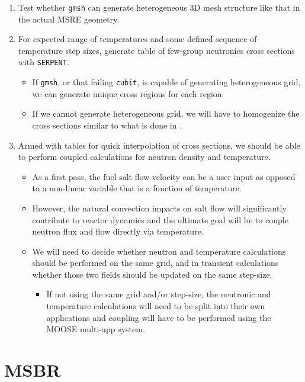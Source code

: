 \documentclass{article}
\let\Oldsection\section
\renewcommand{\section}{\FloatBarrier\Oldsection}
\newcommand{\code}[1]{\texttt{#1}}
\begin{document}
\begin{enumerate}
\item Test whether \code{gmsh} can generate heterogeneous 3D mesh structure
  like that in the actual \gls{MSRE} geometry.
\item For expected range of temperatures and some defined sequence of
  temperature step sizes, generate table of few-group neutronics cross sections
  with \code{SERPENT}.
  \begin{itemize}
    \item If \code{gmsh}, or that failing \code{cubit}, is capable of generating
      heterogeneous grid, we can generate unique cross regions for each region
    \item If we cannot generate heterogeneous grid, we will have to homogenize
      the cross sections similar to what is done in
      \cite{kophazi_development_2009}.
  \end{itemize}
\item Armed with tables for quick interpolation of cross sections, we should be
  able to perform coupled calculations for neutron density and
  temperature.
  \begin{itemize}
    \item As a first pass, the fuel salt flow velocity can be a user input as 
            opposed to a non-linear variable that is a function of temperature.
    \item However, the natural convection impacts on salt flow will 
            significantly contribute to reactor dynamics and the ultimate goal 
            will be to couple neutron flux and flow directly via 
            temperature.
    \item We will need to decide whether neutron and temperature calculations
      should be performed on the same grid, and in transient calculations
      whether those two fields should be updated on the same step-size.
      \begin{itemize}
        \item If not using the same grid and/or step-size, the neutronic and
          temperature calculations will need to be split into their own
          applications and coupling will have to be performed using the MOOSE
          multi-app system.
      \end{itemize}
  \end{itemize}
\end{enumerate}

\section{MSBR}
\end{document}
